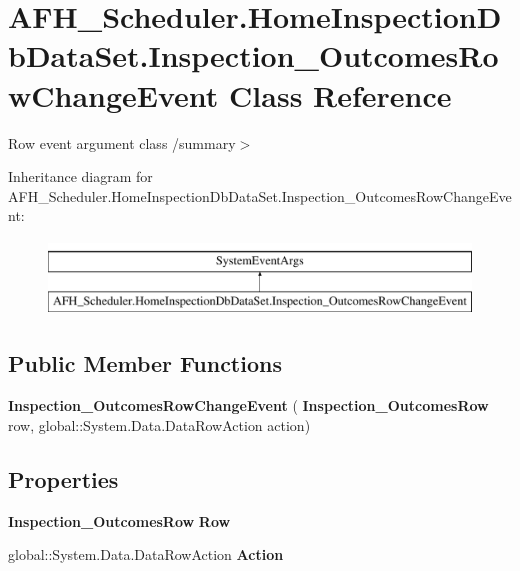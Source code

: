 \section{A\+F\+H\+\_\+\+Scheduler.\+Home\+Inspection\+Db\+Data\+Set.\+Inspection\+\_\+\+Outcomes\+Row\+Change\+Event Class Reference}
\label{class_a_f_h___scheduler_1_1_home_inspection_db_data_set_1_1_inspection___outcomes_row_change_event}


Row event argument class /summary$>$  


Inheritance diagram for A\+F\+H\+\_\+\+Scheduler.\+Home\+Inspection\+Db\+Data\+Set.\+Inspection\+\_\+\+Outcomes\+Row\+Change\+Event\+:\begin{figure}[H]
\begin{center}
\leavevmode
\includegraphics[height=2.000000cm]{class_a_f_h___scheduler_1_1_home_inspection_db_data_set_1_1_inspection___outcomes_row_change_event}
\end{center}
\end{figure}
\subsection*{Public Member Functions}
\begin{DoxyCompactItemize}
\item 
\mbox{\label{class_a_f_h___scheduler_1_1_home_inspection_db_data_set_1_1_inspection___outcomes_row_change_event_af4ae03b8b8d4ba7e973e8511674b2d50}} 
{\bfseries Inspection\+\_\+\+Outcomes\+Row\+Change\+Event} (\textbf{ Inspection\+\_\+\+Outcomes\+Row} row, global\+::\+System.\+Data.\+Data\+Row\+Action action)
\end{DoxyCompactItemize}
\subsection*{Properties}
\begin{DoxyCompactItemize}
\item 
\mbox{\label{class_a_f_h___scheduler_1_1_home_inspection_db_data_set_1_1_inspection___outcomes_row_change_event_a77b4c8ad5e88407ec99e89d22849aa96}} 
\textbf{ Inspection\+\_\+\+Outcomes\+Row} {\bfseries Row}\hspace{0.3cm}{\ttfamily  [get]}
\item 
\mbox{\label{class_a_f_h___scheduler_1_1_home_inspection_db_data_set_1_1_inspection___outcomes_row_change_event_aa8a79f421590c330f62a7c68bd25d596}} 
global\+::\+System.\+Data.\+Data\+Row\+Action {\bfseries Action}\hspace{0.3cm}{\ttfamily  [get]}
\end{DoxyCompactItemize}


